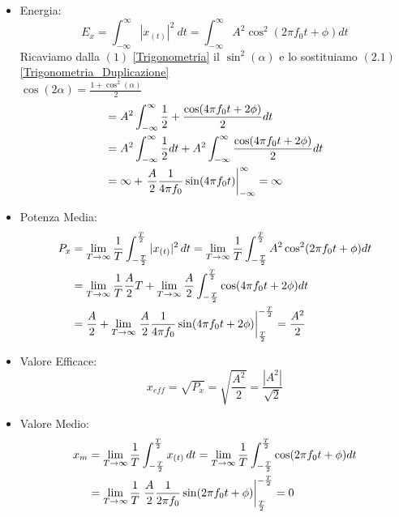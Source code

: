             \begin{itemize}
                \item {Energia:
                    \[
                        E_{x} = \int_{-\infty}^{\infty} |x_{(t)}|^2 \ dt = \int_{-\infty}^{\infty} A^2 \cos^2(2\pi f_0 t + \phi) dt 
                    \]
                    Ricaviamo dalla $(1)$ \ref{Trigonometria} il $\sin^2(\alpha)$ e lo sostituiamo $(2.1)$ \ref{Trigonometria_Duplicazione} \\ $\cos(2\alpha) = \frac{1+ \cos^2(\alpha)}{2}$
                    \begin{align}
                            &= A^2  \int_{-\infty}^{\infty} \frac{1}{2} + \frac{\cos(4\pi f_0 t + 2\phi)}{2} dt \nonumber \\
                            &= A^2  \int_{-\infty}^{\infty} \frac{1}{2} dt + A^2 \int_{-\infty}^{\infty} \frac{\cos(4\pi f_0 t + 2\phi)}{2} dt \nonumber \\
                            &= \infty +\eval{\frac{A}{2} \frac{1}{4\pi f_0} \sin(4\pi f_0 t) }_{-\infty}^{\infty} = \infty \nonumber
                    \end{align}
                }
                \item {Potenza Media:
                    \begin{align}
                        P_{x} &=\lim_{T\rightarrow\infty}  \frac{1}{T} \int_{-\frac{T}{2}}^{\frac{T}{2}}  |x_{(t)}|^2 \,dt =\lim_{T\rightarrow\infty} \frac{1}{T} \int_{-\frac{T}{2}}^{\frac{T}{2}} A^2 \cos^2(2\pi f_0 t + \phi) dt \nonumber\\
                              &= \lim_{T\rightarrow\infty} \frac{1}{T} \frac{A}{2}T + \lim_{T\rightarrow\infty} \frac{A}{2}\int_{-\frac{T}{2}}^{\frac{T}{2}}\cos(4\pi f_0 t + 2\phi) dt  \nonumber\\
                              &= \frac{A}{2} + \lim_{T\rightarrow\infty} \eval{\frac{A}{2}\frac{1}{4\pi f_0}\sin(4\pi f_0 t + 2\phi)}_{\frac{T}{2}}^{-\frac{T}{2}} = \frac{A^2}{2} \nonumber
                    \end{align}
                }
                \item {Valore Efficace:
                    \[
                        x_{eff} = \sqrt{P_{x}} = \sqrt{\frac{A^2}{2}} =\frac{|A^2|}{\sqrt{2}} 
                    \]
                }
                \item {Valore Medio:
                    \begin{align}
                        x_{m} &= \lim_{T\rightarrow\infty} \frac{1}{T} \int_{-\frac{T}{2}}^{\frac{T}{2}}  x_{(t)} \,dt =\lim_{T\rightarrow\infty} \frac{1}{T} \int_{-\frac{T}{2}}^{\frac{T}{2}}\cos(2\pi f_0 t+\phi) dt \nonumber \\
                              &= \lim_{T\rightarrow\infty} \frac{1}{T}  \eval{\frac{A}{2}\frac{1}{2\pi f_0}\sin(2\pi f_0 t + \phi)}_{\frac{T}{2}}^{-\frac{T}{2}} = 0 \nonumber
                    \end{align}
                }
            \end{itemize}

